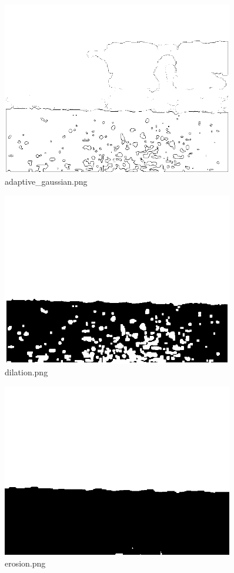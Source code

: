 \documentclass[a4paper,11pt]{article}
\begin{document}
\begin{figure}[p]
	\centering
	\includegraphics[width=0.9\textwidth]{images/morph_transform/adaptive_gaussian.png}
	\caption{adaptive\_gaussian.png}
\end{figure}
\clearpage

\begin{figure}[p]
	\centering
	\includegraphics[width=0.9\textwidth]{images/morph_transform/dilation.png}
	\caption{dilation.png}
\end{figure}

\begin{figure}[p]
	\centering
	\includegraphics[width=0.9\textwidth]{images/morph_transform/erosion.png}
	\caption{erosion.png}
\end{figure}
\clearpage
\end{document}
